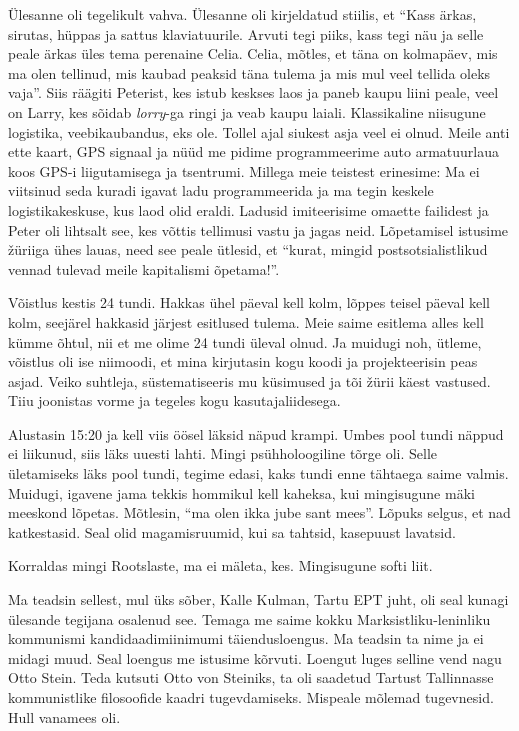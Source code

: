 
Ülesanne oli tegelikult vahva. Ülesanne oli kirjeldatud stiilis, et \enquote{Kass ärkas, sirutas, hüppas ja sattus klaviatuurile. Arvuti tegi piiks, kass tegi näu ja selle  peale ärkas üles tema perenaine Celia. Celia, mõtles, et  täna on kolmapäev, mis ma olen tellinud, mis kaubad peaksid täna tulema ja mis mul veel tellida oleks vaja}. Siis räägiti Peterist, kes istub keskses laos ja paneb kaupu liini peale, veel on Larry, kes sõidab \emph{lorry}-ga ringi ja veab  kaupu laiali. Klassikaline niisugune logistika, veebikaubandus, eks ole. Tollel ajal siukest asja veel ei olnud. Meile anti ette  kaart,  GPS signaal ja nüüd me pidime programmeerime auto armatuurlaua koos GPS-i liigutamisega ja tsentrumi. Millega meie teistest erinesime: Ma ei viitsinud seda kuradi igavat ladu programmeerida ja ma tegin keskele logistikakeskuse, kus laod olid eraldi. Ladusid imiteerisime omaette failidest ja  Peter oli lihtsalt see, kes võttis tellimusi vastu ja jagas neid. Lõpetamisel istusime žüriiga ühes lauas, need see peale ütlesid, et \enquote{kurat, mingid postsotsialistlikud vennad tulevad meile kapitalismi õpetama!}. 

Võistlus kestis 24 tundi. Hakkas ühel päeval kell kolm, lõppes teisel päeval kell kolm, seejärel hakkasid järjest esitlused tulema. Meie saime esitlema alles kell kümme õhtul, nii et me olime 24 tundi üleval olnud. Ja muidugi noh, ütleme, võistlus oli ise niimoodi, et mina kirjutasin kogu koodi ja projekteerisin peas asjad. Veiko suhtleja, süstematiseeris mu küsimused ja tõi žürii käest vastused. Tiiu joonistas vorme ja tegeles kogu kasutajaliidesega. 

Alustasin 15:20 ja kell viis öösel läksid näpud krampi. Umbes pool tundi näppud ei liikunud, siis läks uuesti lahti. Mingi psühholoogiline tõrge oli. Selle ületamiseks läks pool tundi, tegime edasi, kaks tundi enne tähtaega saime valmis. Muidugi, igavene jama tekkis  hommikul kell kaheksa, kui  mingisugune mäki meeskond lõpetas. Mõtlesin, \enquote{ma olen ikka jube sant mees}. Lõpuks selgus, et nad katkestasid. Seal olid magamisruumid, kui sa tahtsid, kasepuust lavatsid. 


Korraldas mingi Rootslaste, ma ei mäleta, kes. Mingisugune softi liit. 

Ma teadsin sellest, mul üks sõber, Kalle Kulman, Tartu EPT juht, oli seal kunagi ülesande tegijana osalenud see. Temaga me saime kokku Marksistliku-leninliku kommunismi kandidaadimiinimumi täiendusloengus. Ma teadsin ta nime ja ei midagi muud. Seal loengus me istusime kõrvuti. Loengut luges selline vend nagu Otto Stein. Teda kutsuti Otto von Steiniks, ta oli saadetud Tartust Tallinnasse kommunistlike filosoofide kaadri tugevdamiseks. Mispeale mõlemad tugevnesid. Hull vanamees oli.

